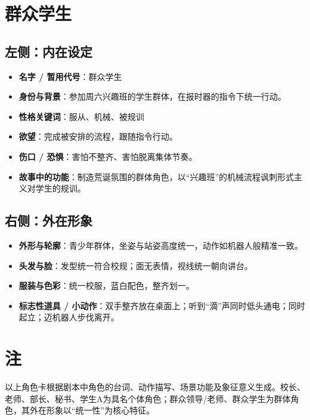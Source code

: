 \documentclass[11pt, a4paper]{article}
\begin{document}
	\newpage
	
	\section{群众学生}
	
	\subsection*{左侧：内在设定}
	
	\begin{itemize}[leftmargin=2em, itemsep=0.2em]
		\item \textbf{名字 / 暂用代号}：群众学生
		\item \textbf{身份与背景}：参加周六兴趣班的学生群体，在报时器的指令下统一行动。
		\item \textbf{性格关键词}：服从、机械、被规训
		\item \textbf{欲望}：完成被安排的流程，跟随指令行动。
		\item \textbf{伤口 / 恐惧}：害怕不整齐、害怕脱离集体节奏。
		\item \textbf{故事中的功能}：制造荒诞氛围的群体角色，以“兴趣班”的机械流程讽刺形式主义对学生的规训。
	\end{itemize}
	
	\subsection*{右侧：外在形象}
	
	\begin{itemize}[leftmargin=2em, itemsep=0.2em]
		\item \textbf{外形与轮廓}：青少年群体，坐姿与站姿高度统一，动作如机器人般精准一致。
		\item \textbf{头发与脸}：发型统一符合校规；面无表情，视线统一朝向讲台。
		\item \textbf{服装与色彩}：统一校服，蓝白配色，整齐划一。
		\item \textbf{标志性道具 / 小动作}：双手整齐放在桌面上；听到“滴”声同时低头通电；同时起立；迈机器人步伐离开。
	\end{itemize}
	
	\newpage
	
	\section*{注}
	
	以上角色卡根据剧本中角色的台词、动作描写、场景功能及象征意义生成。校长、老师、部长、秘书、学生A为具名个体角色；群众领导/老师、群众学生为群体角色，其外在形象以“统一性”为核心特征。
	
\end{document}
